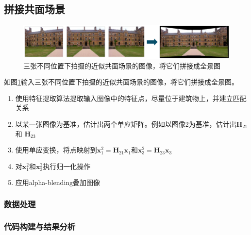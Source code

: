 \documentclass{article}
\begin{document}
\subsection{拼接共面场景}

\begin{figure}[h]
    \centering
    \includegraphics[width=1\textwidth]{./xinhaochuli/3.png}
    \caption{三张不同位置下拍摄的近似共面场景的图像，将它们拼接成全景图}
    \label{fig:3}
\end{figure}

如图\ref{fig:3}输入三张不同位置下拍摄的近似共面场景的图像，将它们拼接成全景图。

\begin{enumerate}
  \item 使用特征提取算法提取输入图像中的特征点，尽量位于建筑物上，并建立匹配关系
  \item 以某一张图像为基准，估计出两个单应矩阵。例如以图像2为基准，估计出$\mathbf{H}_{21}$ 和 $\mathbf{H}_{23}$
  \item 使用单应变换，将点映射到$\mathbf{x}_1^2=\mathbf{H}_{21}\mathbf{x}_1$和$\mathbf{x}_3^2=\mathbf{H}_{23}\mathbf{x}_3$
  \item 对$\mathbf{x}_1^2$和$\mathbf{x}_3^2$执行归一化操作
  \item 应用alpha-blending叠加图像
\end{enumerate}

\subsubsection{数据处理}
\subsubsection{代码构建与结果分析}
\end{document}
